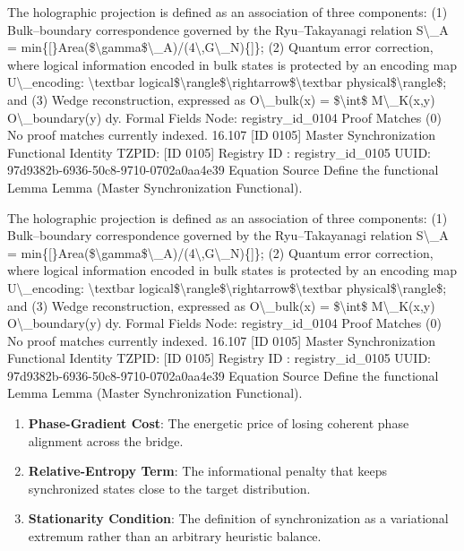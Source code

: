The holographic projection is defined as an association of three components: (1) Bulk--boundary correspondence governed by the Ryu--Takayanagi relation S\textbackslash{}\_A = min\{[\}Area(\$\textbackslash{}gamma\$\textbackslash{}\_A)/(4\textbackslash{},G\textbackslash{}\_N)\{]\}; (2) Quantum error correction, where logical information encoded in bulk states is protected by an encoding map U\textbackslash{}\_encoding: \textbackslash{}textbar logical\$\textbackslash{}rangle\$\textbackslash{}rightarrow\$\textbackslash{}textbar physical\$\textbackslash{}rangle\$; and (3) Wedge reconstruction, expressed as O\textbackslash{}\_bulk(x) = \$\textbackslash{}int\$ M\textbackslash{}\_K(x,y) O\textbackslash{}\_boundary(y) dy. Formal Fields Node: registry\_id\_0104 Proof Matches (0) No proof matches currently indexed. 16.107 [ID 0105] Master Synchronization Functional Identity TZPID: [ID 0105] Registry ID : registry\_id\_0105 UUID: 97d9382b-6936-50c8-9710-0702a0aa4e39 Equation Source Define the functional Lemma Lemma (Master Synchronization Functional).

The holographic projection is defined as an association of three components: (1) Bulk--boundary correspondence governed by the Ryu--Takayanagi relation S\textbackslash{}\_A = min\{[\}Area(\$\textbackslash{}gamma\$\textbackslash{}\_A)/(4\textbackslash{},G\textbackslash{}\_N)\{]\}; (2) Quantum error correction, where logical information encoded in bulk states is protected by an encoding map U\textbackslash{}\_encoding: \textbackslash{}textbar logical\$\textbackslash{}rangle\$\textbackslash{}rightarrow\$\textbackslash{}textbar physical\$\textbackslash{}rangle\$; and (3) Wedge reconstruction, expressed as O\textbackslash{}\_bulk(x) = \$\textbackslash{}int\$ M\textbackslash{}\_K(x,y) O\textbackslash{}\_boundary(y) dy. Formal Fields Node: registry\_id\_0104 Proof Matches (0) No proof matches currently indexed. 16.107 [ID 0105] Master Synchronization Functional Identity TZPID: [ID 0105] Registry ID : registry\_id\_0105 UUID: 97d9382b-6936-50c8-9710-0702a0aa4e39 Equation Source Define the functional Lemma Lemma (Master Synchronization Functional).
\endgroup

\begin{enumerate}[leftmargin=1.6em,itemsep=6pt,topsep=4pt]
\item \textbf{Phase-Gradient Cost}: The energetic price of losing coherent phase alignment across the bridge.
\item \textbf{Relative-Entropy Term}: The informational penalty that keeps synchronized states close to the target distribution.
\item \textbf{Stationarity Condition}: The definition of synchronization as a variational extremum rather than an arbitrary heuristic balance.
\end{enumerate}

